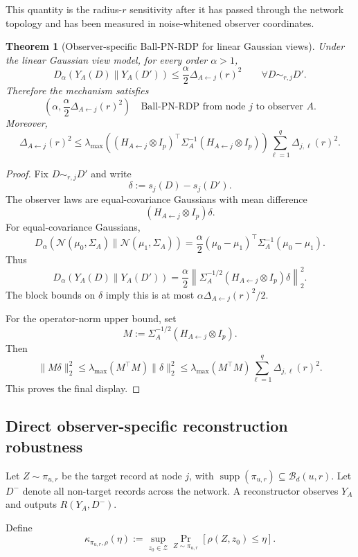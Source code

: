 \documentclass[conference,compsoc]{IEEEtran}
\newtheorem{theorem}{Theorem}
\DeclareMathOperator{\supp}{supp}
\newcommand{\N}{\mathcal{N}}
\newcommand{\cZ}{\mathcal{Z}}
\newcommand{\cB}{\mathcal{B}}
\begin{document}
This quantity is the radius-$r$ sensitivity after it has passed through the network topology and has been measured in noise-whitened observer coordinates.

\begin{theorem}[Observer-specific Ball-PN-RDP for linear Gaussian views]
\label{thm:linear-gaussian-rdp}
Under the linear Gaussian view model, for every order $\alpha>1$,
\[
D_\alpha(Y_A(D)\|Y_A(D'))
\le
\frac{\alpha}{2}\Delta_{A\leftarrow j}(r)^2
\qquad\forall D\sim_{r,j}D'.
\]
Therefore the mechanism satisfies
\[
\left(\alpha,\frac{\alpha}{2}\Delta_{A\leftarrow j}(r)^2\right)
\quad\text{Ball-PN-RDP from node }j\text{ to observer }A.
\]
Moreover,
\[
\Delta_{A\leftarrow j}(r)^2
\le
\lambda_{\max}\!\left((H_{A\leftarrow j}\otimes I_p)^\top\Sigma_A^{-1}(H_{A\leftarrow j}\otimes I_p)\right)
\sum_{\ell=1}^q\Delta_{j,\ell}(r)^2.
\]
\end{theorem}

\begin{proof}
Fix $D\sim_{r,j}D'$ and write
\[
\delta:=s_j(D)-s_j(D').
\]
The observer laws are equal-covariance Gaussians with mean difference
\[
(H_{A\leftarrow j}\otimes I_p)\delta.
\]
For equal-covariance Gaussians,
\[
D_\alpha(\N(\mu_0,\Sigma_A)\|\N(\mu_1,\Sigma_A))
=
\frac{\alpha}{2}(\mu_0-\mu_1)^\top\Sigma_A^{-1}(\mu_0-\mu_1).
\]
Thus
\[
D_\alpha(Y_A(D)\|Y_A(D'))
=
\frac{\alpha}{2}
\left\|
\Sigma_A^{-1/2}(H_{A\leftarrow j}\otimes I_p)\delta
\right\|_2^2.
\]
The block bounds on $\delta$ imply this is at most $\alpha\Delta_{A\leftarrow j}(r)^2/2$.

For the operator-norm upper bound, set
\[
M:=\Sigma_A^{-1/2}(H_{A\leftarrow j}\otimes I_p).
\]
Then
\[
\|M\delta\|_2^2\le\lambda_{\max}(M^\top M)\|\delta\|_2^2
\le
\lambda_{\max}(M^\top M)\sum_{\ell=1}^q\Delta_{j,\ell}(r)^2.
\]
This proves the final display.
\end{proof}

\subsection{Direct observer-specific reconstruction robustness}

Let $Z\sim\pi_{u,r}$ be the target record at node $j$, with $\supp(\pi_{u,r})\subseteq\cB_d(u,r)$. Let $D^-$ denote all non-target records across the network. A reconstructor observes $Y_A$ and outputs $R(Y_A,D^-)$.

Define
\[
\kappa_{\pi_{u,r},\rho}(\eta)
:=
\sup_{z_0\in\cZ}
\Pr_{Z\sim\pi_{u,r}}[\rho(Z,z_0)\le\eta].
\]
\end{document}
